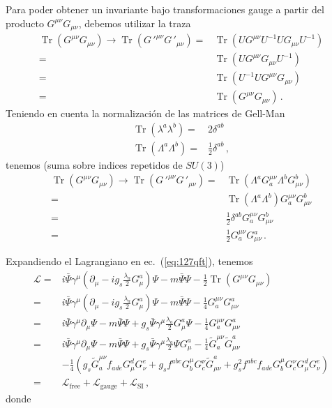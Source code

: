 Para poder obtener un invariante bajo transformaciones gauge a partir del producto $G^{\mu\nu}G_{\mu\nu}$, debemos utilizar la traza 
\begin{align}
  \operatorname{Tr}\left(G^{\mu\nu}G_{\mu\nu}\right)\to
  \operatorname{Tr}\left({G\,'}^{\mu\nu}{G\,'}_{\mu\nu}\right)
  =&\operatorname{Tr}\left(U{{G}}^{\mu\nu}U^{-1}U{{G}}_{\mu\nu}U^{-1}\right)\nonumber\\
  =&\operatorname{Tr}\left(U{{G}}^{\mu\nu}{{G}}_{\mu\nu}U^{-1}\right)\nonumber\\
  =&\operatorname{Tr}\left(U^{-1}U{{G}}^{\mu\nu}{{G}}_{\mu\nu}\right)\nonumber\\
  =&\operatorname{Tr}\left({{G}}^{\mu\nu}{{G}}_{\mu\nu}\right)\,.
\end{align}
Teniendo en cuenta la normalización de las matrices de Gell-Man
\begin{align}
  \operatorname{Tr}\left(\lambda^a\lambda^b\right)=&2\delta^{ab}\nonumber\\
  \operatorname{Tr}\left(\Lambda^a\Lambda^b\right)=&\frac{1}{2}\delta^{ab}\,,
\end{align}
tenemos (suma sobre indices repetidos de $SU(3)$)
\begin{align}
  \operatorname{Tr}\left(G^{\mu\nu}G_{\mu\nu}\right)\to
  \operatorname{Tr}\left({G\,'}^{\mu\nu}{G\,'}_{\mu\nu}\right)
  =&\operatorname{Tr}\left(\Lambda^a{G}^{\mu\nu}_a \Lambda^b{G}_{\mu\nu}^b\right)\nonumber\\
  =&\operatorname{Tr}\left(\Lambda^a \Lambda^b\right){G}^{\mu\nu}_a {G}_{\mu\nu}^b\nonumber\\
  =&\frac{1}{2}\delta^{a b}{G}^{\mu\nu}_a {G}_{\mu\nu}^b\nonumber\\
  =&\frac{1}{2}{G}^{\mu\nu}_a {G}_{\mu\nu}^a\,.
\end{align}

Expandiendo el Lagrangiano en ec.~(\ref{eq:127qft}), tenemos
\begin{align}
  \mathcal{L}=&i\bar{\Psi}\gamma^\mu\left(\partial_\mu-i g_s\frac{\lambda_a}{2}G_\mu^a\right)\Psi
  -m\bar{\Psi}\Psi- \frac{1}{2}\operatorname{Tr}\left(G^{\mu\nu} G_{\mu\nu}\right)\nonumber\\
  =&i\bar{\Psi}\gamma^\mu\left(\partial_\mu-i g_s\frac{\lambda_a}{2}G_\mu^a\right)\Psi
  -m\bar{\Psi}\Psi- \frac{1}{4}G^{\mu\nu}_a G_{\mu\nu}^a\nonumber\\
=&i\bar{\Psi}\gamma^\mu\partial_\mu\Psi-m\bar{\Psi}\Psi+g_s\bar{\Psi}\gamma^\mu\frac{\lambda_a}{2}G_\mu^a\Psi
  - \frac{1}{4}G^{\mu\nu}_a G_{\mu\nu}^a\nonumber\\
=&i\bar{\Psi}\gamma^\mu\partial_\mu\Psi-m\bar{\Psi}\Psi+g_s\bar{\Psi}\gamma^\mu\frac{\lambda_a}{2}\Psi G_\mu^a
  - \frac{1}{4}\widetilde{G}^{\mu\nu}_a \widetilde{G}_{\mu\nu}^a\nonumber\\
  &- \frac{1}{4}\left(g_s\widetilde{G}^{\mu\nu}_af_{a d e}G^d_\mu G^e_\nu
    +g_sf^{a b c}G_b^\mu G_c^\nu\widetilde{G}_{\mu\nu}^a
    +g_s^2f^{a b c}f_{a d e}G_b^\mu G_c^\nu G^d_\mu G^e_\nu\right)\nonumber\\
=&\mathcal{L}_{\text{free}}+\mathcal{L}_{\text{gauge}}+\mathcal{L}_{\text{SI}}\,,
\end{align}
donde

